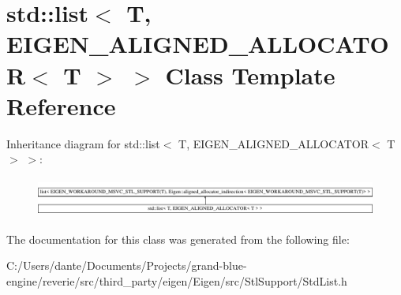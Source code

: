 \hypertarget{classstd_1_1list_3_01_t_00_01_e_i_g_e_n___a_l_i_g_n_e_d___a_l_l_o_c_a_t_o_r_3_01_t_01_4_01_4}{}\section{std\+::list$<$ T, E\+I\+G\+E\+N\+\_\+\+A\+L\+I\+G\+N\+E\+D\+\_\+\+A\+L\+L\+O\+C\+A\+T\+OR$<$ T $>$ $>$ Class Template Reference}
\label{classstd_1_1list_3_01_t_00_01_e_i_g_e_n___a_l_i_g_n_e_d___a_l_l_o_c_a_t_o_r_3_01_t_01_4_01_4}
Inheritance diagram for std\+::list$<$ T, E\+I\+G\+E\+N\+\_\+\+A\+L\+I\+G\+N\+E\+D\+\_\+\+A\+L\+L\+O\+C\+A\+T\+OR$<$ T $>$ $>$\+:\begin{figure}[H]
\begin{center}
\leavevmode
\includegraphics[height=1.302326cm]{classstd_1_1list_3_01_t_00_01_e_i_g_e_n___a_l_i_g_n_e_d___a_l_l_o_c_a_t_o_r_3_01_t_01_4_01_4}
\end{center}
\end{figure}


The documentation for this class was generated from the following file\+:\begin{DoxyCompactItemize}
\item 
C\+:/\+Users/dante/\+Documents/\+Projects/grand-\/blue-\/engine/reverie/src/third\+\_\+party/eigen/\+Eigen/src/\+Stl\+Support/Std\+List.\+h\end{DoxyCompactItemize}
